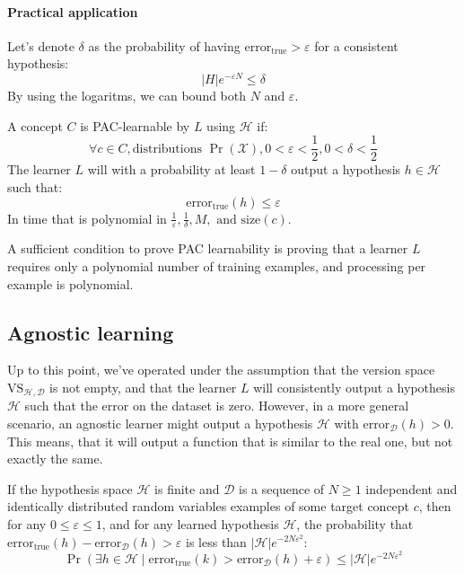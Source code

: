 \paragraph*{Practical application}
Let's denote $\delta$ as the probability of having $\text{error}_{\text{true}}>\varepsilon$ for a consistent hypothesis:
\[\left\lvert H\right\rvert e^{-\varepsilon N} \leq \delta\]
By using the logaritms, we can bound both $N$ and $\varepsilon$. 

\begin{definition}
    A concept $C$ is PAC-learnable by $L$ using $\mathcal{H}$ if: 
    \[\forall c\in C, \text{distributions }\Pr(\mathcal{X}), 0 < \varepsilon < \frac{1}{2},  0 < \delta < \frac{1}{2}\]
    The learner $L$ will with a probability at least $1 - \delta$ output a hypothesis $h \in \mathcal{H}$ such that:
    \[\text{error}_{\text{true}}(h) \leq \varepsilon\] 
    In time that is polynomial in $\frac{1}{\varepsilon}, \frac{1}{\delta}, M, \text{ and }\text{size}(c)$.
\end{definition}
A sufficient condition to prove PAC learnability is proving that a learner $L$ requires only a polynomial number of training examples, and processing per example is polynomial.

\subsection{Agnostic learning}
Up to this point, we've operated under the assumption that the version space $\text{VS}_{\mathcal{H},\mathcal{D}}$ is not empty, and that the learner $L$ will consistently output a hypothesis $\mathcal{H}$ such that the error on the dataset is zero. 
However, in a more general scenario, an agnostic learner might output a hypothesis $\mathcal{H}$ with $\text{error}_{\mathcal{D}}(h) > 0$.
This means, that it will output a function that is similar to the real one, but not exactly the same. 
\begin{theorem}
    If the hypothesis space $\mathcal{H}$ is finite and $\mathcal{D}$ is a sequence of $N\geq 1$ independent and identically distributed random variables examples of some target concept $c$, then for any $0 \leq \varepsilon \leq 1$, and for any learned hypothesis $\mathcal{H}$, the probability that $\text{error}_{\text{true}}(h) - \text{error}_{\mathcal{D}}(h) > \varepsilon$ is less than $\left\lvert \mathcal{H}\right\rvert e^{-2N\varepsilon^2}$:
    \[\Pr(\exists h\in \mathcal{H}\mid\text{error}_{\text{true}}(k)>\text{error}_{\mathcal{D}}(h)+\varepsilon)\leq \left\lvert \mathcal{H}\right\rvert e^{-2N\varepsilon^2}\]
\end{theorem}


